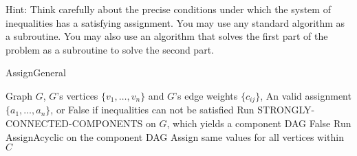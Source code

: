 \begin{itemize}
    Hint: Think carefully about the precise conditions under which the system of inequalities has a satisfying assignment. You may use any standard algorithm as a subroutine. You may also use an algorithm that solves the first part of the problem as a subroutine to solve the second part. \\
    \begin{algorithm}[!ht]
    \caption{AssignGeneral} \label{alg:assign-general}
    \begin{algorithmic}[1]
        \Require Graph $G$, $G$'s vertices $\{v_1, \dots, v_n\}$ and $G$'s edge weights $\{c_{ij}\}$,
        \Ensure An valid assignment $\{a_1, \dots, a_n\}$, or False if inequalities can not be satisfied
        \State Run STRONGLY-CONNECTED-COMPONENTS on $G$, which yields a component DAG
         
             
                \State \Return False
            \EndIf
        \EndFor
        \State Run AssignAcyclic on the component DAG 
         
            \State Assign same values for all vertices within $C$
        \EndFor
    \end{algorithmic}
    \end{algorithm}
\end{itemize}
